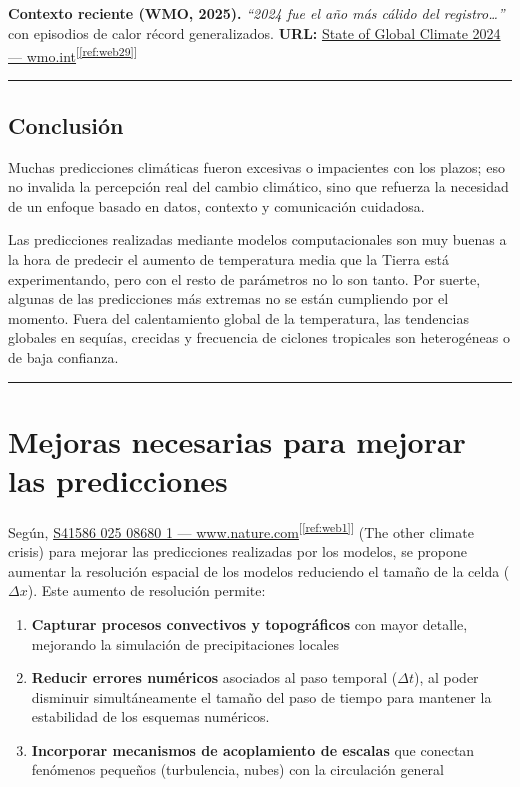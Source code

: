 \documentclass[
  10pt,
  a4paper,
  DIV=11,
  numbers=noendperiod,
  open=any]{scrreprt}
\providecommand{\tightlist}{%
  \setlength{\itemsep}{0pt}\setlength{\parskip}{0pt}}
\numberwithin{equation}{chapter}
\numberwithin{equation}{section}
\renewcommand{\[}{\begin{equation}}
\renewcommand{\]}{\end{equation}}
\newcommand{\refweb}[3]{%
  \href{#1}{#2}\textsuperscript{[\ref{ref:#3}]}%
}
\begin{document}
\textbf{Contexto reciente (WMO, 2025).} \emph{“2024 fue el año más cálido del registro…”} con episodios de calor récord generalizados.
\textbf{URL:} \refweb{https://wmo.int/publication-series/state-of-global-climate-2024}{State of Global Climate 2024 — wmo.int}{web29}

\begin{center}\rule{0.5\linewidth}{0.5pt}\end{center}

\subsection{Conclusión}\label{conclusiuxf3n}

Muchas predicciones climáticas fueron excesivas o impacientes con los
plazos; eso no invalida la percepción real del cambio climático, sino
que refuerza la necesidad de un enfoque basado en datos, contexto y
comunicación cuidadosa.

Las predicciones realizadas mediante modelos computacionales son muy
buenas a la hora de predecir el aumento de temperatura media que la
Tierra está experimentando, pero con el resto de parámetros no lo son
tanto. Por suerte, algunas de las predicciones más extremas no se están cumpliendo
por el momento. Fuera del calentamiento global de la temperatura, las tendencias globales en sequías, crecidas y frecuencia de ciclones tropicales son heterogéneas o de baja confianza. 

\begin{center}\rule{0.5\linewidth}{0.5pt}\end{center}

\section{Mejoras necesarias para mejorar las predicciones}\label{mejoras-necesarias-rejillas-muxe1s-densas-y-avances-computacionales}

Según, \refweb{https://www.nature.com/articles/s41586-025-08680-1}{S41586 025 08680 1 — www.nature.com}{web1} (The
other climate crisis) para mejorar las predicciones realizadas por los
modelos, se propone aumentar la resolución espacial de los modelos
reduciendo el tamaño de la celda (\(\Delta x\)). Este aumento de
resolución permite:

\begin{enumerate}
\def\labelenumi{\arabic{enumi}.}
\tightlist
\item
  \textbf{Capturar procesos convectivos y topográficos} con mayor
  detalle, mejorando la simulación de precipitaciones locales\\
\item
  \textbf{Reducir errores numéricos} asociados al paso temporal
  (\(\Delta t\)), al poder disminuir simultáneamente el tamaño del paso
  de tiempo para mantener la estabilidad de los esquemas numéricos.\\
\item
  \textbf{Incorporar mecanismos de acoplamiento de escalas} que conectan
  fenómenos pequeños (turbulencia, nubes) con la circulación general
\end{enumerate}
\end{document}
